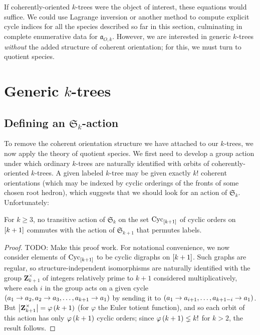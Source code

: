 \documentclass[sectionflow,singlespace,twoside,boldmathhdr]{brandiss} %
\numberwithin{section}{chapter}
\numberwithin{figure}{chapter}
\begin{document}
If coherently-oriented $k$-trees were the object of interest, these equations would suffice.
We could use Lagrange inversion or another method to compute explicit cycle indices for all the species described so far in this section, culminating in complete enumerative data for $\mathfrak{a}_{O, k}$.
However, we are interested in generic $k$-trees \emph{without} the added structure of coherent orientation; for this, we must turn to quotient species.

\section{Generic $k$-trees}
\subsection{Defining an $\mathfrak{S}_{k}$-action}\label{ss:saction}
To remove the coherent orientation structure we have attached to our $k$-trees, we now apply the theory of quotient species.
We first need to develop a group action under which ordinary $k$-trees are naturally identified with orbits of coherently-oriented $k$-trees.
A given labeled $k$-tree may be given exactly $k!$ coherent orientations (which may be indexed by cyclic orderings of the fronts of some chosen root hedron), which suggests that we should look for an action of $\mathfrak{S}_{k}$. Unfortunately:

\begin{lemma}
  \label{lem:notransac}
  For $k \geq 3$, no transitive action of $\mathfrak{S}_{k}$ on the set $\operatorname{Cyc}_{\left[ {k+1} \right]}$ of cyclic orders on $\left[ {k+1} \right]$ commutes with the action of $\mathfrak{S}_{k+1}$ that permutes labels.
\end{lemma}
\begin{proof}
  TODO: Make this proof work.
  For notational convenience, we now consider elements of $\operatorname{Cyc}_{\left[ {k+1} \right]}$ to be cyclic digraphs on $\left[ {k+1} \right]$.
  Such graphs are regular, so structure-independent isomorphisms are naturally identified with the group $\mathbf{Z}_{k+1}^{\times}$ of integers relatively prime to $k+1$ considered multiplicatively, where each $i$ in the group acts on a given cycle $\left( {a_{1} \to a_{2}, a_{2} \to a_{3}, \dots, a_{k+1} \to a_{1}} \right)$ by sending it to $\left( {a_{1} \to a_{i+1}, \dots, a_{k+1-i} \to a_{1}} \right)$.
  But $\left\vert {\mathbf{Z}_{k+1}^{\times}} \right\vert = \varphi \left( {k+1} \right)$ (for $\varphi$ the Euler totient function), and so each orbit of this action has only $\varphi \left( {k+1} \right)$ cyclic orders; since $\varphi \left( {k+1} \right) \lneq k!$ for $k > 2$, the result follows.
\end{proof}
\end{document}
